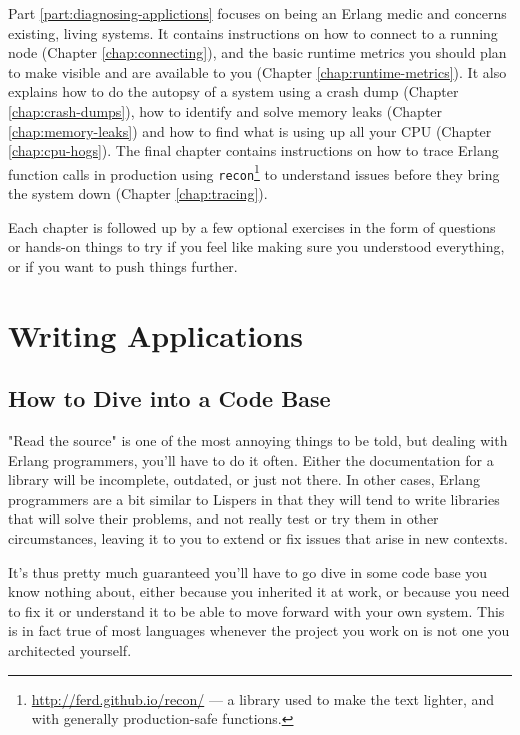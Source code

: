 \documentclass[11pt, oneside]{book}   	%
\newcommand{\otpapp}[1]{\Verb`#1`}
\begin{document}
Part \ref{part:diagnosing-applictions} focuses on being an Erlang medic and concerns existing, living systems. It contains instructions on how to connect to a running node (Chapter \ref{chap:connecting}), and the basic runtime metrics you should plan to make visible and are available to you (Chapter \ref{chap:runtime-metrics}). It also explains how to do the autopsy of a system using a crash dump (Chapter \ref{chap:crash-dumps}), how to identify and solve memory leaks (Chapter \ref{chap:memory-leaks}) and how to find what is using up all your CPU (Chapter \ref{chap:cpu-hogs}). The final chapter contains instructions on how to trace Erlang function calls in production using \otpapp{recon}\footnote{\href{http://ferd.github.io/recon/}{http://ferd.github.io/recon/} — a library used to make the text lighter, and with generally production-safe functions.} to understand issues before they bring the system down (Chapter \ref{chap:tracing}).

Each chapter is followed up by a few optional exercises in the form of questions or hands-on things to try if you feel like making sure you understood everything, or if you want to push things further.

\part{Writing Applications}
\label{part:writing-applications}

\chapter{How to Dive into a Code Base}
\label{chap:how-to-dive-into-a-code-base}

"Read the source" is one of the most annoying things to be told, but dealing with Erlang programmers, you'll have to do it often. Either the documentation for a library will be incomplete, outdated, or just not there. In other cases, Erlang programmers are a bit similar to Lispers in that they will tend to write libraries that will solve their problems, and not really test or try them in other circumstances, leaving it to you to extend or fix issues that arise in new contexts.

It's thus pretty much guaranteed you'll have to go dive in some code base you know nothing about, either because you inherited it at work, or because you need to fix it or understand it to be able to move forward with your own system. This is in fact true of most languages whenever the project you work on is not one you architected yourself.
\end{document}
